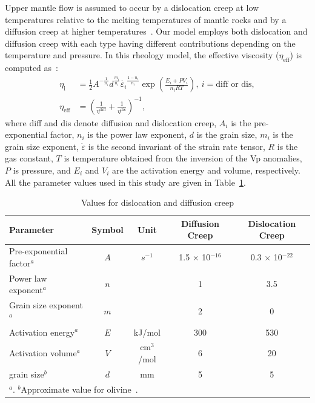\documentclass[draft,linenumbers]{agujournal2018}
\begin{document}
Upper mantle flow is assumed to occur by a dislocation creep at low temperatures relative to the melting temperatures of mantle rocks and by a diffusion creep at higher temperatures~\citep[e.g.,][]{gordon1967thermally}. Our model employs both dislocation and diffusion creep with each type having different contributions depending on the temperature and pressure. In this rheology model, the effective viscosity ($\eta_{\text{eff}}$) is computed as~\citep{billen2007rheologic}:
%
\begin{align}
    \eta_{\text{i}} &= \frac{1}{2} A^{-\frac{1}{n_i}} d^\frac{m_i}{n_i} \dot{\varepsilon_i}^{\frac{1-n_i}{n_i}} \exp\left(\frac{E_i + PV_i}{n_iRT}\right),\ i=\text{diff or dis}, \\
    \eta_{\text{eff}} &= \left(\frac{1}{\eta^\text{diff}} + \frac{1}{\eta^\text{dis}}\right)^{-1},
\end{align}
%
where diff and dis denote diffusion and dislocation creep, $A_i$ is the pre-exponential factor, $n_i$ is the power law exponent, $d$ is the grain size, $m_i$ is the grain size exponent, $\dot{\varepsilon}$ is the second invariant of the strain rate tensor, $R$ is the gas constant, $T$ is temperature obtained from the inversion of the Vp anomalies, $P$ is pressure, and $E_i$ and $V_i$ are the activation energy and volume, respectively. All the parameter values used in this study are given in Table~\ref{table_model}.
%
\begin{table}[ht] 
    \caption{Values for dislocation and diffusion creep}
    \centering
    \begin{tabular}{l c c c c}
    \hline
     Parameter  & Symbol & Unit & Diffusion Creep & Dislocation Creep  \\
    \hline
      Pre-exponential factor$^a$ & $A$ & $s^{-1}$ & 1.5 $\times$ 10$^{-16}$ & 0.3 $\times$ 10$^{-22}$   \\
      Power law exponent$^a$ & $n$ & & 1 & 3.5  \\
      Grain size exponent$^a$  & $m$ & & 2 & 0   \\
      Activation energy$^a$  & $E$ & kJ/mol & 300 & 530   \\
      Activation volume$^a$  & $V$ & cm$^3$/mol & 6 & 20 \\
      grain size$^b$         & $d$ & mm & 5 & 5 \\
    \hline
    \multicolumn{5}{l}{$^{a}$\citet{karato1993rheology}. $^b$Approximate value for olivine~\citep{karato1984grain}.}
    \end{tabular}
    \label{table_model}
\end{table}
\end{document}
